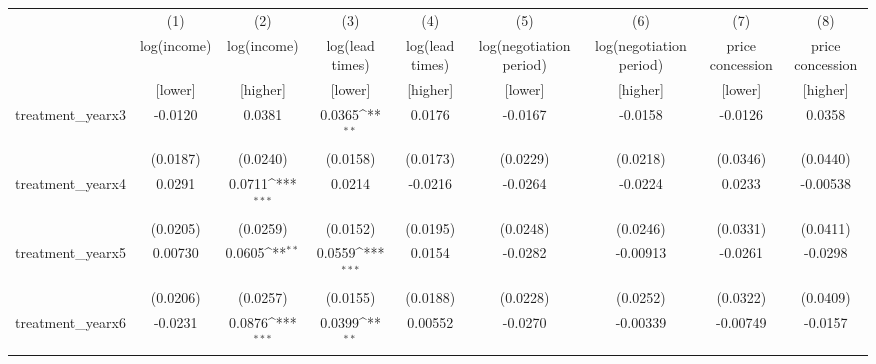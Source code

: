{
\def\sym#1{\ifmmode^{#1}\else\(^{#1}\)\fi}
\begin{adjustbox}{max width=\textwidth}
\begin{tabular}{l*{8}{c}}
\toprule
            &\multicolumn{1}{c}{(1)}&\multicolumn{1}{c}{(2)}&\multicolumn{1}{c}{(3)}&\multicolumn{1}{c}{(4)}&\multicolumn{1}{c}{(5)}&\multicolumn{1}{c}{(6)}&\multicolumn{1}{c}{(7)}&\multicolumn{1}{c}{(8)}\\
            &\multicolumn{1}{c}{log(income)}&\multicolumn{1}{c}{log(income)}&\multicolumn{1}{c}{log(lead times)}&\multicolumn{1}{c}{log(lead times)}&\multicolumn{1}{c}{log(negotiation period)}&\multicolumn{1}{c}{log(negotiation period)}&\multicolumn{1}{c}{price concession}&\multicolumn{1}{c}{price concession}\\
            &\multicolumn{1}{c}{[lower]}&\multicolumn{1}{c}{[higher]}&\multicolumn{1}{c}{[lower]}&\multicolumn{1}{c}{[higher]}&\multicolumn{1}{c}{[lower]}&\multicolumn{1}{c}{[higher]}&
            \multicolumn{1}{c}{[lower]}&\multicolumn{1}{c}{[higher]}\\
\midrule
\midrule
treatment\_yearx3&     -0.0120         &      0.0381         &      0.0365\sym{**} &      0.0176         &     -0.0167         &     -0.0158         &     -0.0126         &      0.0358         \\
            &    (0.0187)         &    (0.0240)         &    (0.0158)         &    (0.0173)         &    (0.0229)         &    (0.0218)         &    (0.0346)         &    (0.0440)         \\
\addlinespace
treatment\_yearx4&      0.0291         &      0.0711\sym{***}&      0.0214         &     -0.0216         &     -0.0264         &     -0.0224         &      0.0233         &    -0.00538         \\
            &    (0.0205)         &    (0.0259)         &    (0.0152)         &    (0.0195)         &    (0.0248)         &    (0.0246)         &    (0.0331)         &    (0.0411)         \\
\addlinespace
treatment\_yearx5&     0.00730         &      0.0605\sym{**} &      0.0559\sym{***}&      0.0154         &     -0.0282         &    -0.00913         &     -0.0261         &     -0.0298         \\
            &    (0.0206)         &    (0.0257)         &    (0.0155)         &    (0.0188)         &    (0.0228)         &    (0.0252)         &    (0.0322)         &    (0.0409)         \\
\addlinespace
treatment\_yearx6&     -0.0231         &      0.0876\sym{***}&      0.0399\sym{**} &     0.00552         &     -0.0270         &    -0.00339         &    -0.00749         &     -0.0157         \\

\end{tabular}
\end{adjustbox}}

